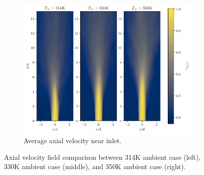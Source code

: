 \begin{figure}[H]
\begin{subfigure}{0.5\textwidth}
	\includegraphics[scale=.45]{figures/Plots/vertical/v_scaled_vert_avg_all_zoom.pdf}
	\caption{Average axial velocity near inlet.} \label{all_v_3}
\end{subfigure}
\caption{Axial velocity field comparison between 314K ambient case (left), 330K ambient case (middle), and 350K ambient case (right).}
\label{all_v_features}
\end{figure}

